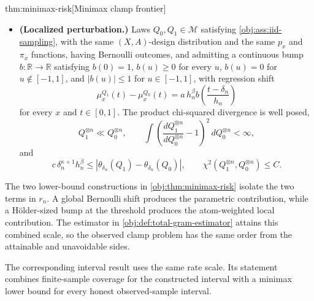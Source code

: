 \begin{theoremv}{thm:minimax-risk}[Minimax clamp frontier]
\begin{itemize}
\[
\mu_x^{P_1}(a)=\mu_x^{P_0}(a)+n^{-1/2}
\quad\text{for every }x\text{ and }a\in[0,1],
\]
with well-posed product chi-squared divergence,
\[
P_1^{\otimes n}\ll P_0^{\otimes n},
\qquad
\int \left(\frac{dP_1^{\otimes n}}{dP_0^{\otimes n}}-1\right)^2\,dP_0^{\otimes n}<\infty,
\]
and
\[
c n^{-1/2}
\leq
\left|\theta_{\delta_n}(P_1)-\theta_{\delta_n}(P_0)\right|,
\qquad
\chi^2\!\left(P_1^{\otimes n},P_0^{\otimes n}\right)\leq C .
\]
\item \textbf{(Localized perturbation.)} Laws \(Q_0,Q_1\in\mathcal M\) satisfying \cref{obj:ass:iid-sampling}, with the same \((X,A)\)-design distribution and the same \(p_x\) and \(\pi_x\) functions, having Bernoulli outcomes, and admitting a continuous bump \(b:\mathbb R\to\mathbb R\) satisfying \(b(0)=1\), \(b(u)\geq0\) for every \(u\), \(b(u)=0\) for \(u\notin[-1,1]\), and \(|b(u)|\leq1\) for \(u\in[-1,1]\), with regression shift
\[
\mu_x^{Q_1}(t)-\mu_x^{Q_0}(t)
=
a\,h_n^\beta b\!\left(\frac{t-\delta_n}{h_n}\right)
\]
for every \(x\) and \(t\in[0,1]\). The product chi-squared divergence is well posed,
\[
Q_1^{\otimes n}\ll Q_0^{\otimes n},
\qquad
\int \left(\frac{dQ_1^{\otimes n}}{dQ_0^{\otimes n}}-1\right)^2\,dQ_0^{\otimes n}<\infty,
\]
and
\[
c\,\delta_n^{\kappa+1}h_n^\beta
\leq
\left|\theta_{\delta_n}(Q_1)-\theta_{\delta_n}(Q_0)\right|,
\qquad
\chi^2\!\left(Q_1^{\otimes n},Q_0^{\otimes n}\right)\leq C .
\]
\end{itemize}
\end{theoremv}

The two lower-bound constructions in \cref{obj:thm:minimax-risk} isolate the two terms in \(r_n\). A global Bernoulli shift produces the parametric contribution, while a Hölder-sized bump at the threshold produces the atom-weighted local contribution. The estimator in \cref{obj:def:total-gram-estimator} attains this combined scale, so the observed clamp problem has the same order from the attainable and unavoidable sides.

The corresponding interval result uses the same rate scale. Its statement combines finite-sample coverage for the constructed interval with a minimax lower bound for every honest observed-sample interval.

